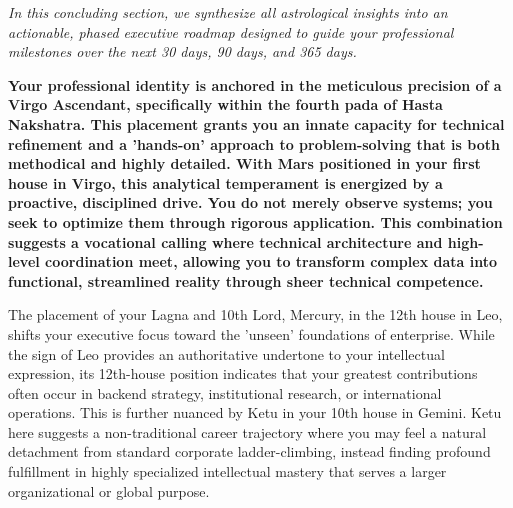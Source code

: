 


{\fontsize{9.5}{14}\selectfont\color{DeepSlate}\itshape In this concluding section, we synthesize all astrological insights into an actionable, phased executive roadmap designed to guide your professional milestones over the next 30 days, 90 days, and 365 days.}\par\vspace{3.5mm}

\label{topic65}

{\fontsize{9.5}{13.8}\selectfont\bfseries\color{DeepSlate} Your professional identity is anchored in the meticulous precision of a Virgo Ascendant, specifically within the fourth pada of Hasta Nakshatra. This placement grants you an innate capacity for technical refinement and a 'hands-on' approach to problem-solving that is both methodical and highly detailed. With Mars positioned in your first house in Virgo, this analytical temperament is energized by a proactive, disciplined drive. You do not merely observe systems; you seek to optimize them through rigorous application. This combination suggests a vocational calling where technical architecture and high-level coordination meet, allowing you to transform complex data into functional, streamlined reality through sheer technical competence.}\par\vspace{2mm}

{\fontsize{9}{13}\selectfont The placement of your Lagna and 10th Lord, Mercury, in the 12th house in Leo, shifts your executive focus toward the 'unseen' foundations of enterprise. While the sign of Leo provides an authoritative undertone to your intellectual expression, its 12th-house position indicates that your greatest contributions often occur in backend strategy, institutional research, or international operations. This is further nuanced by Ketu in your 10th house in Gemini. Ketu here suggests a non-traditional career trajectory where you may feel a natural detachment from standard corporate ladder-climbing, instead finding profound fulfillment in highly specialized intellectual mastery that serves a larger organizational or global purpose.}\par\vspace{1.8mm}

